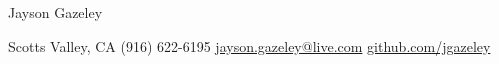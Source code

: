 \begin{header}
    \fontsize{16pt}{16pt}\selectfont Jayson Gazeley\\[5pt]
    \normalsize

    Scotts Valley, CA \headersep
    (916) 622-6195 \headersep
    \href{mailto:jayson.gazeley@live.com}{jayson.gazeley@live.com} \headersep
    \href{https://github.com/jgazeley}{\faGithub \: github.com/jgazeley}
\end{header}